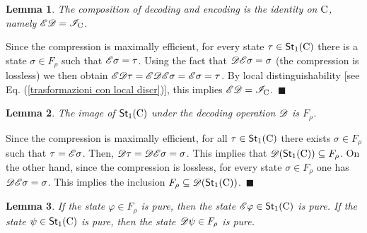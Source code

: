\documentclass[12pt,aps,pra,showpacs,groupedaddress]{revtex4-1}
\newtheorem{lemma}{Lemma} \newtheorem{proposition}{Proposition}
\def\Proof{\medskip\par\noindent{\bf Proof. }}
\def\qed{$\,\blacksquare$\par}
\def\rC{{\rm C}}
\def\Stset{{\mathsf{St}}}
\def\Trnset{{\mathsf{Transf}}}
\begin{document}



\begin{lemma}
  The composition of decoding and encoding is the identity on $\rC$, namely $ \tE  \tD  =   \tI_\rC$.
  \label{lem:EDeqI}
\end{lemma}


\Proof Since the compression is maximally efficient, for every state $\tau\in\Stset_1(\rC)$ there is
a state $\sigma\in F_\rho$ such that $\mathscr E \sigma=\tau$. Using the fact that $\mathscr D\mathscr E \sigma = \sigma
$ (the compression is lossless) we then obtain $\mathscr E\mathscr D\tau=\mathscr E\mathscr D\mathscr E\sigma=\mathscr E\sigma=\tau$. By local
distinguishability [see Eq. (\ref{trasformazioni con local discr})], this implies $\tE\tD =
\tI_\rC$. \qed



\begin{lemma}
  The image of $\Stset_1(\rC)$ under the decoding operation $\mathscr D $ is $F_\rho$.
\label{lem:rangedec}
\end{lemma}

\Proof Since the compression is maximally efficient, for all
$\tau\in\Stset_1(\rC)$ there exists $\sigma\in F_\rho$ such that
$\tau=\mathscr E\sigma$. Then, $\mathscr D\tau=\mathscr D\mathscr E\sigma=\sigma$. This implies
that $\tD (\Stset_1(\rC)) \subseteq F_\rho$. On the other hand, since
the compression is lossless, for every state $\sigma \in F_\rho$ one
has $\mathscr D \mathscr E \sigma = \sigma $. This implies the inclusion $F_\rho
\subseteq \tD (\Stset_1 (\rC))$.  \qed

\begin{lemma}
  If the state $\varphi \in F_\rho$ is pure, then the state $\tE
  \varphi \in\Stset_1 (\rC)$ is pure.  If the state $\psi\in\Stset_1
  (\rC)$ is pure, then the state $\mathscr D \psi \in F_\rho$ is pure.
  \label{lem:pureenc}
\end{lemma}
\end{document}
